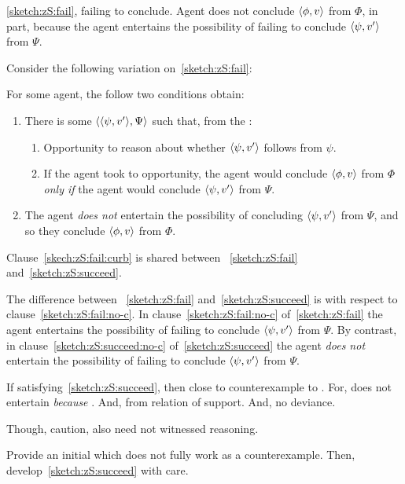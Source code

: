 \begin{note}
  \autoref{sketch:zS:fail}, failing to conclude.
  Agent does not conclude \(\langle \phi, v \rangle\) from \(\Phi\), in part, because the agent entertains the possibility of failing to conclude \(\langle \psi, v' \rangle\) from \(\Psi\).

  Consider the following variation on~\autoref{sketch:zS:fail}:
  \begin{sketch}
    \label{sketch:zS:succeed}
    For some agent, the follow two conditions obtain:
    \begin{enumerate}
    \item
      \label{sketch:zS:succeed:curb}
      There is some \(\langle \langle \psi, v' \rangle, \Psi \rangle\) such that, from the \agpe{}:
      \begin{enumerate}[label=\alph*., ref=(\alph*)]
      \item
        \label{sketch:zS:succeed:curb:opportunity}
        Opportunity to reason about whether \(\langle \psi, v' \rangle\) follows from \(\psi\).
      \item
        \label{sketch:zS:succeed:curb:conditional}
        If the agent took to opportunity, the agent would conclude \(\langle \phi, v \rangle\) from \(\Phi\) \emph{only if} the agent would conclude \(\langle \psi, v' \rangle\) from \(\Psi\).
      \end{enumerate}
    \item
      \label{sketch:zS:succeed:no-c}
      The agent \emph{does not} entertain the possibility of concluding \(\langle \psi, v' \rangle\) from \(\Psi\), and so they conclude \(\langle \phi, v \rangle\) from \(\Phi\).
    \end{enumerate}%
    \vspace{-\baselineskip}
  \end{sketch}

  Clause~\ref{skech:zS:fail:curb} is shared between ~\ref{sketch:zS:fail} and~\ref{sketch:zS:succeed}.

  The difference between ~\ref{sketch:zS:fail} and~\ref{sketch:zS:succeed} is with respect to clause~\ref{sketch:zS:fail:no-c}.
  In clause~\ref{sketch:zS:fail:no-c} of~\autoref{sketch:zS:fail} the agent entertains the possibility of failing to conclude \(\langle \psi, v' \rangle\) from \(\Psi\).
  By contrast, in clause~\ref{sketch:zS:succeed:no-c} of~\autoref{sketch:zS:succeed} the agent \emph{does not} entertain the possibility of failing to conclude \(\langle \psi, v' \rangle\) from \(\Psi\).
\end{note}

\begin{note}
  If  satisfying~\autoref{sketch:zS:succeed}, then close to counterexample to \issueConstraint{}.
  For, does not entertain \emph{because} \fc{}.
  And, from  \fc{} relation of support.
  And, no deviance.

  Though, caution, also need not witnessed reasoning.

  Provide an initial \scen{} which does not fully work as a counterexample.
  Then, develop~\autoref{sketch:zS:succeed} with care.
\end{note}

